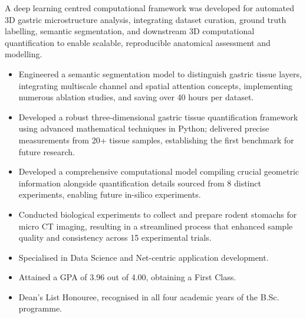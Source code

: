 \documentclass[12pt,a4paper,withhyper]{altacv}
\begin{document}
A deep learning centred computational framework was developed for automated 3D gastric microstructure analysis, integrating dataset curation, ground truth labelling, semantic segmentation, and downstream 3D computational quantification to enable scalable, reproducible anatomical assessment and modelling.
\begin{itemize}
    \item Engineered a semantic segmentation model to distinguish gastric tissue layers, integrating multiscale channel and spatial attention concepts, implementing numerous ablation studies, and saving over 40 hours per dataset.
    \item Developed a robust three-dimensional gastric tissue quantification framework using advanced mathematical techniques in Python; delivered precise measurements from 20+ tissue samples, establishing the first benchmark for future research.
    \item Developed a comprehensive computational model compiling crucial geometric information alongside quantification details sourced from 8 distinct experiments, enabling future in-silico experiments.
    \item Conducted biological experiments to collect and prepare rodent stomachs for micro CT imaging, resulting in a streamlined process that enhanced sample quality and consistency across 15 experimental trials.
\end{itemize}

\divider{}

\begin{itemize}
    \item Specialised in Data Science and Net-centric application development.
    \item Attained a GPA of 3.96 out of 4.00, obtaining a First Class.
    \item Dean’s List Honouree, recognised in all four academic years of the B.Sc. programme.
\end{itemize}

\medskip
\end{document}
